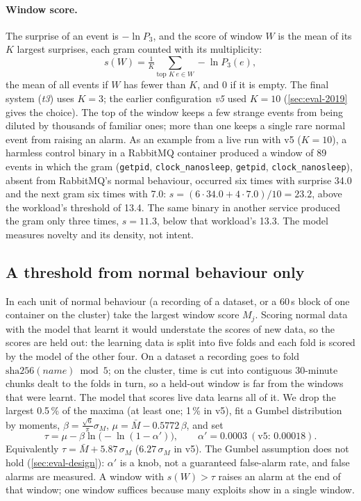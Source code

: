 \paragraph{Window score.} The surprise of an event is $-\ln P_3$, and the score of window $W$ is the mean of its $K$
largest surprises, each gram counted with its multiplicity:
\begin{equation}
s(W)=\tfrac{1}{K}\textstyle\sum_{\text{top } K\ e\in W}-\ln P_3(e),
\end{equation}
the mean of all events if $W$ has fewer than $K$, and $0$ if it is empty. The final system (\emph{t3}) uses $K=3$; the
earlier configuration \emph{v5} used $K=10$ (\cref{sec:eval-2019} gives the choice). The top of the window keeps a few
strange events from being diluted by thousands of familiar ones; more than one keeps a single rare normal event from
raising an alarm. As an example from a live run with v5 ($K=10$), a harmless control binary in a RabbitMQ container produced a window of
89 events in which the gram (\texttt{getpid}, \texttt{clock\_nanosleep}, \texttt{getpid}, \texttt{clock\_nanosleep}),
absent from RabbitMQ's normal behaviour, occurred six times with surprise 34.0 and the next gram six times with 7.0:
$s=(6\cdot 34.0+4\cdot 7.0)/10=23.2$, above the workload's threshold of 13.4. The same binary in another service
produced the gram only three times, $s=11.3$, below that workload's 13.3. The model measures novelty and its density,
not intent.

\subsection{A threshold from normal behaviour only}\label{sec:threshold}

In each unit of normal behaviour (a recording of a dataset, or a 60\,s block of one container on the cluster) take
the largest window score $M_j$. Scoring normal data with the model that learnt it would understate the scores of new
data, so the scores are held out: the learning data is split into five folds and each fold is scored by the model of
the other four. On a dataset a recording goes to fold $\mathrm{sha256}(\mathit{name})\bmod 5$; on the cluster, time is
cut into contiguous 30-minute chunks dealt to the folds in turn, so a held-out window is far from the windows that were
learnt. The model that scores live data learns all of it. We drop the largest 0.5\,\% of the maxima (at least one; 1\,\% in v5), fit a
Gumbel distribution~\cite{coles2001} by moments,
$\beta=\frac{\sqrt6}{\pi}\sigma_M$, $\mu=\bar M-0.5772\,\beta$, and set
\begin{equation}
\tau=\mu-\beta\ln\bigl(-\ln(1-\alpha')\bigr),\qquad \alpha'=0.0003\ (\text{v5: } 0.00018) .
\end{equation}
Equivalently $\tau=\bar M+5.87\,\sigma_M$ ($6.27\,\sigma_M$ in v5). The Gumbel assumption does not hold
(\cref{sec:eval-design}): $\alpha'$ is a knob, not a guaranteed false-alarm rate, and false alarms are measured.
A window with $s(W)>\tau$ raises an alarm at the end of that window; one window suffices because many exploits show in
a single window.

